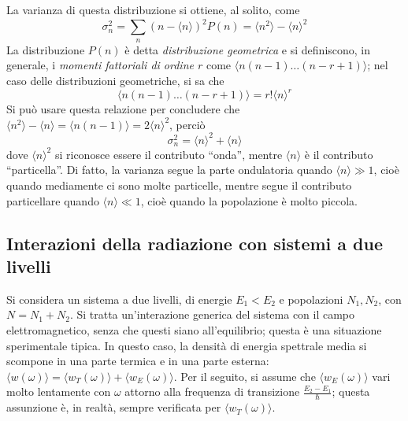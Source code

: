 \documentclass[11pt, a4paper]{scrartcl}
\theoremstyle{style}
\numberwithin{equation}{subsection}
\begin{document}
La varianza di questa distribuzione si ottiene, al solito, come
\[
\sigma _n^2  = \sum_{n}^{} \left(n - \langle n \rangle\right) ^2 P(n) = \langle n^2 \rangle - \langle n \rangle^2
\] 
La distribuzione $P(n)$ \`e detta \textit{distribuzione geometrica} e si definiscono, in generale, i \textit{momenti fattoriali di ordine $r$} come $\langle n ( n-1) \ldots (n-r+1) \rangle$; nel caso delle distribuzioni geometriche, si sa che 
\[
\langle n ( n-1) \ldots (n-r+1) \rangle = r! \langle n \rangle^r
\] 
Si pu\`o usare questa relazione per concludere che $\langle n^2 \rangle - \langle n \rangle= \langle n (n-1) \rangle= 2 \langle n \rangle^2$, perci\`o
\begin{equation}
\sigma ^2_n = \langle n \rangle^2 + \langle n \rangle
\end{equation}
dove $\langle n \rangle^2$ si riconosce essere il contributo ``onda'', mentre $\langle n \rangle$ \`e il contributo ``particella''.
Di fatto, la varianza segue la parte ondulatoria quando $\langle n \rangle\gg 1$, cio\`e quando mediamente ci sono molte particelle, mentre segue il contributo particellare quando $\langle n \rangle \ll 1$, cio\`e quando la popolazione \`e molto piccola.

\subsection{Interazioni della radiazione con sistemi a due livelli}
Si considera un sistema a due livelli, di energie $E_1< E_2$ e popolazioni $N_1, N_2$, con $N = N_1+N_2$.
Si tratta un'interazione generica del sistema con il campo elettromagnetico, senza che questi siano all'equilibrio; questa \`e una situazione sperimentale tipica. 
In questo caso, la densit\`a di energia spettrale media si scompone in una parte termica e in una parte esterna: $\langle w(\omega ) \rangle = \langle w_T (\omega ) \rangle+ \langle w_E(\omega ) \rangle$.
Per il seguito, si assume che $\langle w_E(\omega ) \rangle$ vari molto lentamente con $\omega $ attorno alla frequenza di transizione $\frac{E_2 -E_1}{\hbar }$; questa assunzione \`e, in realt\`a, sempre verificata per $\langle w_T(\omega ) \rangle$.
\end{document}
